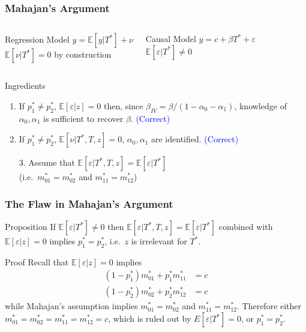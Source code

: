 \documentclass{beamer}
\begin{document}
\begin{frame}[label=MAHAJAN_APPEND]
  \frametitle{Mahajan's Argument}
    \begin{columns}[c]
    \begin{exampleblock}{Regression Model}
      $y = \mathbb{E}[y|T^*] + \nu$\\
      {\small $\mathbb{E}[\nu|T^*]=0$ by construction}
    \end{exampleblock}
    \begin{exampleblock}{Causal Model}
     $y = c + \beta T^* + \varepsilon$\\
     {\small$\mathbb{E}[\varepsilon|T^*]\neq 0$}
    \end{exampleblock}
    \end{columns}

    \vspace{0.7em}

    \begin{block}{Ingredients}
      
  \begin{enumerate}
    \item If $p^*_1 \neq p^*_2$, $\mathbb{E}[\varepsilon|z]=0$ then, since $\beta_{IV} = \beta/(1-\alpha_0-\alpha_1)$, knowledge of $\alpha_0,\alpha_1$ is sufficient to recover $\beta$. \textcolor{blue}{(Correct)}
    \item If $p^*_1 \neq p^*_2$, $\mathbb{E}[\nu|T^*,T,z]=0$, $\alpha_0, \alpha_1$ are identified. \textcolor{blue}{(Correct)}
    \item[] \alert{}
    \item[3.] Assume that $\mathbb{E}[\varepsilon|T^*,T,z]=\mathbb{E}[\varepsilon|T^*]$ \\ {\small (i.e.\ $m_{01}^* = m_{02}^*$ and $m_{11}^*=m_{12}^*$)}
  \end{enumerate}
    \end{block}
\end{frame}
\begin{frame}
  \frametitle{The Flaw in Mahajan's Argument}
  \begin{block}{Proposition}
    If $\mathbb{E}[\varepsilon|T^*]\neq 0$ then  $\mathbb{E}[\varepsilon|T^*,T,z]=\mathbb{E}[\varepsilon|T^*]$ combined with $\mathbb{E}[\varepsilon|z]=0$ implies $p^*_1 = p^*_2$, i.e.\ $z$ is irrelevant for $T^*$.
  \end{block}
  \begin{block}{Proof}
    Recall that $\mathbb{E}[\varepsilon|z]=0$ implies
  \begin{align*}
     (1-p_1^*) m^*_{01} + p^*_1 m^*_{11}&=c\\
     (1-p_2^*) m^*_{02} + p^*_2 m^*_{12}&=c
  \end{align*}
  while Mahajan's assumption implies $m_{01}^* = m_{02}^*$ and $m_{11}^*=m_{12}^*$.
  Therefore either $m_{01}^*=m_{02}^* = m_{11}^* =m_{12}^*=c$, which is ruled out by $E[\varepsilon|T^*]=0$, or $p^*_1 = p^*_2$.
  \end{block}
    \hyperlink{MAHAJAN_BODY}{}
\end{frame}
\end{document}
